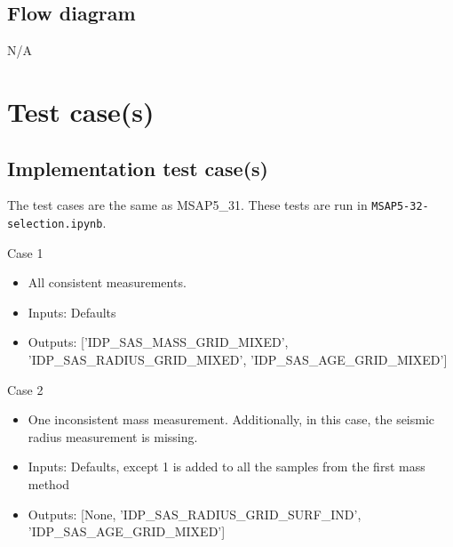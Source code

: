 \documentclass[a4paper, oneside, 11pt, article, english]{memoir}
\begin{document}
\section{Flow diagram}
\label{sec:flowchart}

N/A



\clearpage
\chapter{Test case(s)}
\label{chap:tests}


\section{Implementation test case(s)}
\label{sec:test-implement}


{
  \itshape

}

The test cases are the same as MSAP5\_31. These tests are run in \texttt{MSAP5-32-selection.ipynb}. 

Case 1
  \begin{itemize}
      \firmlist
      \item All consistent measurements. 
      \item Inputs: Defaults
      \item Outputs: ['IDP\_SAS\_MASS\_GRID\_MIXED', 'IDP\_SAS\_RADIUS\_GRID\_MIXED', 'IDP\_SAS\_AGE\_GRID\_MIXED']
  \end{itemize}

Case 2
  \begin{itemize}
      \firmlist
      \item One inconsistent mass measurement. Additionally, in this case, the seismic radius measurement is missing.
      \item Inputs: Defaults, except 1 is added to all the samples from the first mass method
      \item Outputs: [None, 'IDP\_SAS\_RADIUS\_GRID\_SURF\_IND', 'IDP\_SAS\_AGE\_GRID\_MIXED']
  \end{itemize}
\end{document}
